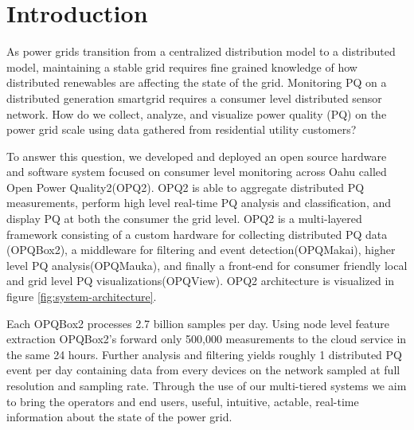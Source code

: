 \documentclass[a4paper, conference]{IEEEtran}
\begin{document}
\section{Introduction}
As power grids transition from a centralized distribution model to a distributed model, maintaining a stable grid requires fine grained knowledge of how distributed renewables are affecting the state of the grid.\cite{ECPAB} Monitoring PQ on a distributed generation smartgrid requires a consumer level distributed sensor network. How do we collect, analyze, and visualize power quality (PQ) on the power grid scale using data gathered from residential utility customers? 

To answer this question, we developed and deployed an open source hardware and software system focused on consumer level monitoring across Oahu called Open Power Quality2(OPQ2). OPQ2 is able to aggregate distributed PQ measurements, perform high level real-time PQ analysis and classification, and display PQ at both the consumer the grid level. OPQ2 is a multi-layered framework consisting of a custom hardware for collecting distributed PQ data (OPQBox2), a middleware for filtering and event detection(OPQMakai), higher level PQ analysis(OPQMauka), and finally a front-end for consumer friendly local and grid level PQ visualizations(OPQView). OPQ2 architecture is visualized in figure \ref{fig:system-architecture}.


Each OPQBox2 processes 2.7 billion samples per day. Using node level feature extraction OPQBox2's forward only 500,000 measurements to the cloud service in the same 24 hours. Further analysis and filtering yields roughly 1 distributed PQ event per day containing data from every devices on the network sampled at full resolution and sampling rate.  Through the use of our multi-tiered systems we aim to bring the operators and end users, useful, intuitive, actable, real-time information about the state of the power grid.

\end{document}
